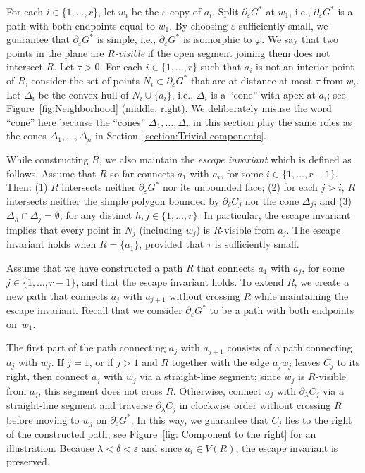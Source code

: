 \documentclass{patmorin}
\begin{document}
For each $i\in \{1,\dots,r\}$, let $w_i$ be the $\varepsilon$-copy of  $a_i$.
Split $\partial_\varepsilon G^*$ at $w_1$, i.e., $\partial_\varepsilon G^*$ is a path with both endpoints equal to $w_1$.
By choosing $\varepsilon$ sufficiently small, we guarantee that $\partial_\varepsilon G^*$ is simple, i.e., $\partial_\varepsilon G^*$ is isomorphic to $\varphi$.
We say that two points in the plane are \emph{$R$-visible} if the open segment joining them does not intersect $R$.
Let $\tau >0$. For each $i\in \{1,\dots,r\}$ such that $a_i$ is not an interior point of $R$, consider the set of points $N_i\subset \partial_\varepsilon G^*$ that are at distance at most $\tau$ from $w_i$.
Let $\Delta_i$ be the convex hull of $N_i\cup \{a_i\}$, i.e., $\Delta_i$ is a ``cone'' with apex at $a_i$; see Figure~\ref{fig:Neighborhood} (middle, right). We deliberately misuse the word ``cone'' here because the ``cones'' $\Delta_1,\ldots,\Delta_r$ in this section play the same roles as the cones $\Delta_1,\ldots,\Delta_n$ in Section~\ref{section:Trivial components}.

While constructing $R$, we also maintain the \emph{escape invariant} which is defined as follows. Assume that $R$ so far connects $a_1$ with $a_i$, for some $i\in \{1,\dots,r-1\}$. Then: (1) $R$ intersects neither $\partial_\varepsilon G^*$ nor its unbounded face; (2) for each $j>i$, $R$ intersects neither the simple polygon bounded by $\partial_\delta C_j$ nor the cone $\Delta_j$; and (3) $\Delta_h\cap \Delta_j = \emptyset$, for any distinct $h,j\in\{1,\ldots,r\}$. In particular, the escape invariant implies that every point in $N_j$ (including $w_j$) is $R$-visible from $a_j$. The escape invariant holds when $R=\{a_1\}$, provided that $\tau$ is sufficiently small.


Assume that we have constructed a path $R$ that connects $a_1$ with $a_j$, for some $j\in\{1,\ldots,r-1\}$, and that the escape invariant holds.  To extend $R$, we create a new path that connects $a_j$ with $a_{j+1}$ without crossing $R$ while maintaining the escape invariant.  Recall that we consider $\partial_\varepsilon G^*$ to be a path with both endpoints on~$w_1$.

The first part of the path connecting $a_j$ with $a_{j+1}$ consists of a path connecting $a_j$ with $w_j$. If $j=1$, or if $j>1$ and $R$ together with the edge $a_j w_j$ leaves $C_j$ to its right, then connect $a_j$ with $w_j$ via a straight-line segment; since $w_j$ is $R$-visible from $a_j$, this segment does not cross $R$. Otherwise, connect $a_j$ with $\partial_\lambda C_j$ via a straight-line segment and traverse $\partial_\lambda C_j$ in clockwise order without crossing $R$ before moving to $w_j$ on $\partial_\varepsilon G^*$. In this way, we guarantee that $C_j$ lies to the right of the constructed path; see Figure~\ref{fig: Component to the right} for an illustration. Because $\lambda < \delta < \varepsilon$ and since $a_i\in V(R)$, the escape invariant is preserved.
\end{document}
